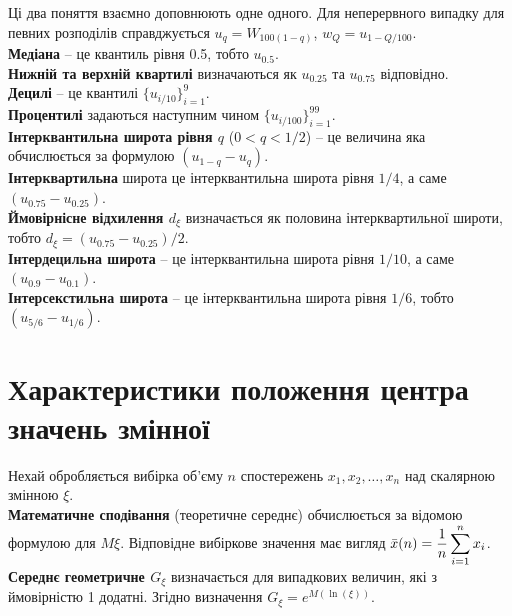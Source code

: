 Ці два поняття взаємно доповнюють одне одного. Для неперервного випадку для певних розподілів справджується $u_q = W_{100 (1 - q)}$, $w_Q = u_{1 - Q / 100}$. \\

\textbf{Медіана} -- це квантиль рівня 0.5, тобто $u_{0.5}$. \\

\textbf{Нижній та верхній квартилі} визначаються як $u_{0.25}$ та $u_{0.75}$ відповідно. \\

\textbf{Децилі} -- це квантилі $\{ u_{i/10} \}_{i=1}^9$. \\

\textbf{Процентилі} задаються наступним чином $\{ u_{i/100} \}_{i=1}^{99}$. \\

\textbf{Інтерквантильна широта рівня $q$} ($0 < q < 1 /2$) -- це величина яка обчислюється за формулою $(u_{1 - q} - u_q)$. \\

\textbf{Інтерквартильна} широта це інтерквантильна широта рівня $1/4$, а саме $(u_{0.75} - u_{0.25})$. \\

\textbf{Ймовірнісне відхилення $d_\xi$} визначається як половина інтерквартильної широти, тобто $d_\xi = (u_{0.75} - u_{0.25}) / 2$. \\

\textbf{Інтердецильна широта} -- це інтерквантильна широта рівня $1 / 10$, а саме $(u_{0.9} - u_{0.1})$. \\

\textbf{Інтерсекстильна широта} -- це інтерквантильна широта рівня $1 / 6$, тобто $(u_{5/6} - u_{1/6})$.

\section{Характеристики положення центра значень змінної}

Нехай обробляється вибірка об'єму $n$ спостережень $x_1, x_2, \ldots, x_n$ над скалярною змінною $\xi$. \\

\textbf{Математичне сподівання} (теоретичне середнє) обчислюється за відомою формулою для $M \xi$. Відповідне вибіркове значення має вигляд $\bar{x}(n)= \dfrac{1}{n} \displaystyle\sum\limits_{i=1}^n x_i$. \\

\textbf{Середнє геометричне $G_\xi$} визначається для випадкових величин, які з ймовірністю 1 додатні. Згідно визначення $G_\xi = e^{M (\ln (\xi))}$. \\


